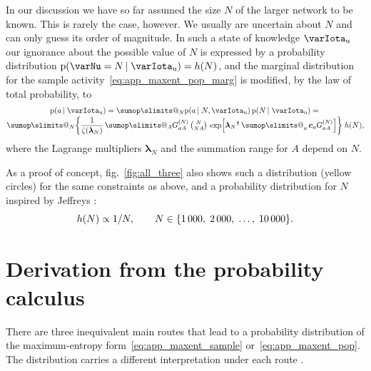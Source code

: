 \documentclass[\ifafour a4paper,12pt,\else a5paper,10pt,\fi%
onecolumn,oneside,article,%
british%
]{memoir}
\makeatletter
\theoremstyle{remark}
\theoremstyle{innote}
\def\sum{\DOTSI\sumop\slimits@}
\newcommand*{\citep}{\parencites}
\DeclarePairedDelimiter\set{\{}{\}}
\newcommand*{\pf}{\mathrm{p}}%
\renewcommand*{\|}{\nonscript\,\vert\nonscript\;\mathopen{}}
\newcommand*{\sect}{\S}%
\newcommand*{\fig}{fig.}%
\newcommand*{\tsum}{\mathop{\textstyle\sum}\nolimits}
\newcommand*{\T}{^\intercal}%
\newcommand*{\ypp}{G}
\newcommand*{\yAv}{A}
\newcommand*{\yav}{a}
\newcommand*{\yNv}{N}
\newcommand*{\yNN}{\varNu}
\newcommand*{\ya}{\yav}%
\newcommand*{\yA}{\yAv}%
\newcommand*{\yHd}{\varIota_\textrm{u}}
\newcommand*{\yg}{\bm{c}}
\newcommand*{\yL}{\bm{\lambda}}
\newcommand*{\yK}{\zeta}
\makeatother
\begin{document}
\bigskip

In our discussion we have so far assumed the size $\yNv$ of the larger
network to be known. This is rarely the case, however. We usually are
uncertain about $\yNv$ and can only guess its order of magnitude. In such a
state of knowledge $\yHd$ our ignorance about the possible value of $\yNv$
is expressed by a probability distribution $\pf(\yNN=\yNv \|\yHd)=h(\yNv)$,
and the marginal distribution for the sample
activity~\eqref{eq:app_maxent_pop_marg} is modified, by the law of total
probability, to
\begin{multline}
  \label{eq:app_maxent_pop_marg_unknown_N}
  \pf(\ya \| \yHd)  =
  \sum_{\yNv} \pf(\ya \| \yNv,\yHd) \,
  \pf(\yNv \|\yHd)
  ={}\\[-\jot]
  \sum_\yNv \biggl\{\frac{1}{\yK(\yL_\yNv)}\, 
  \sum_{\yA} \ypp^{(\yNv)}_{\ya\yA}
\,
  \tbinom{\yNv}{\yNv \yA}\,\exp\Bigl[{\yL_\yNv}\T
  \tsum_{\ya} \yg_{\ya}\ypp^{(\yNv)}_{\ya\yA}\Bigr]\biggr\}
  \;h(\yNv),
\end{multline}
where the Lagrange multipliers $\yL_{\yNv}$ and the summation range for
$\yA$ depend on $\yNv$.

As a proof of concept, \fig~\ref{fig:all_three} also shows such a distribution
(yellow circles) for the same constraints as above, and a probability
distribution for $\yNv$ inspired by Jeffreys
\citep[\sect~4.8]{jeffreys1939_r1983}:
\begin{equation}
  \label{eq:pdf_popsize}
  h(\yNv) \propto 1/\yNv, \qquad
  \yNv \in\set{1\,000,\; 2\,000,\; \dotsc,\;10\,000}.
\end{equation}

\section{Derivation from the probability calculus}
\label{sec:derivation_prob_calculus}

There are three inequivalent main routes that lead to a probability
distribution of the maximum-entropy form~\eqref{eq:app_maxent_sample}
or~\eqref{eq:app_maxent_pop}. The distribution carries a different
interpretation under each route \citep[pp.~52--55,
72--77]{jaynes1979b}[pp.~25--28]{jaynes1982}[\sect~I]{jaynes1982b}{jaynes1986d_r1996}[\sect~11.1]{jaynes1994_r2003}.
\end{document}
